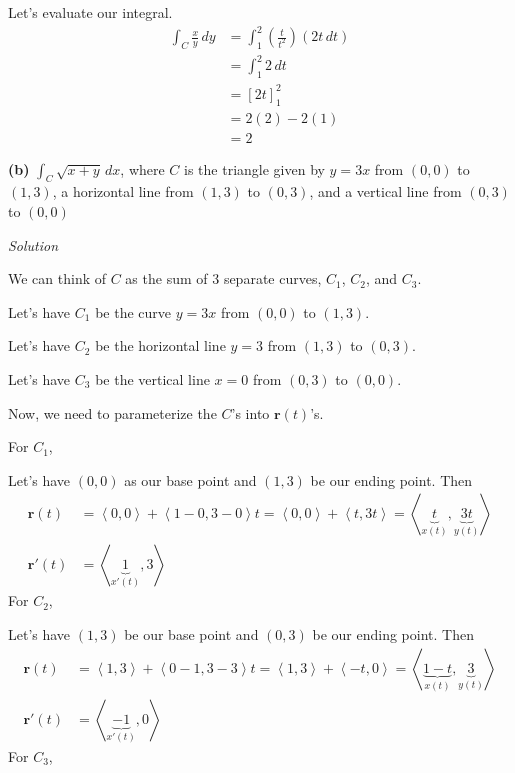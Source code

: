\documentclass{article}
\newcommand{\lrp}[1]{\left( #1 \right)}
\newcommand{\lra}[1]{\left\langle #1 \right\rangle}
\newcommand{\lrb}[1]{\left[ #1 \right]}
\renewcommand{\r}[0]{\mathbf{r}}
\newcommand{\Solution}{\textit{Solution}}
\begin{document}
Let's evaluate our integral.
\begin{align*}
    \int_C \frac{x}{y}\,dy&=\int_1^2 \lrp{\frac{t}{t^2}}\lrp{2t\,dt}\\
    &=\int_1^2 2\,dt\\
    &=\lrb{2t}_1^2\\
    &=2(2)-2(1)\\
    &=\boxed{2}
\end{align*}
{}\textbf{(b)} $\displaystyle \int_C \sqrt{x+y}\,dx$, where $C$ is the triangle given by $y=3x$ from $(0,0)$ to $(1,3)$, a horizontal line from $(1,3)$ to $(0,3)$, and a vertical line from $(0,3)$ to $(0,0)$

\Solution

We can think of $C$ as the sum of 3 separate curves, $C_1$, $C_2$, and $C_3$. 

Let's have $C_1$ be the curve $y=3x$ from $(0,0)$ to $(1,3)$.

Let's have $C_2$ be the horizontal line $y=3$ from $(1,3)$ to $(0,3)$.

Let's have $C_3$ be the vertical line $x=0$ from $(0,3)$ to $(0,0)$.

Now, we need to parameterize the $C$'s into $\r(t)$'s.

For $C_1$,

Let's have $(0,0)$ as our base point and $(1,3)$ be our ending point. Then
\begin{align*}
    \r(t)&=\lra{0,0}+\lra{1 - 0, 3 - 0}t=\lra{0,0}+\lra{t,3t}=\lra{\underbrace{t}_{x(t)},\underbrace{3t}_{y(t)}}\\
    \r'(t)&=\lra{\underbrace{1}_{x'(t)},3}
\end{align*}
For $C_2$,

Let's have $(1,3)$ be our base point and $(0,3)$ be our ending point. Then
\begin{align*}
    \r(t)&=\lra{1,3}+\lra{0-1,3-3}t=\lra{1,3}+\lra{-t,0}=\lra{\underbrace{1-t}_{x(t)},\underbrace{3}_{y(t)}}\\
    \r'(t)&=\lra{\underbrace{-1}_{x'(t)},0}
\end{align*}
For $C_3$,
\end{document}
